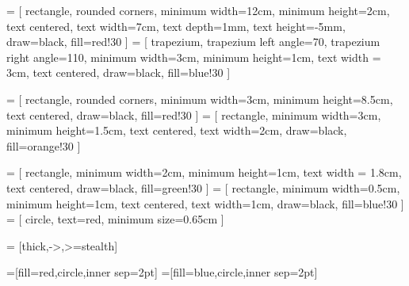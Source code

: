  = [
    rectangle, rounded corners, 
    minimum width=12cm, 
    minimum height=2cm,
    text centered, 
    text width=7cm, 
    text depth=1mm,
    text height=-5mm,
    draw=black, 
    fill=red!30
]
 = [
    trapezium, trapezium left angle=70, trapezium right angle=110, minimum width=3cm,
    minimum height=1cm, text width = 3cm, text centered, draw=black, fill=blue!30
]

 = [
    rectangle, rounded corners, 
    minimum width=3cm, 
    minimum height=8.5cm,
    text centered, 
    draw=black, 
    fill=red!30
]
 = [
    rectangle, 
    minimum width=3cm, 
    minimum height=1.5cm, 
    text centered, 
    text width=2cm, 
    draw=black, 
    fill=orange!30
]

 = [
    rectangle,
    minimum width=2cm, 
    minimum height=1cm, 
    text width = 1.8cm, 
    text centered, 
    draw=black, 
    fill=green!30
]
 = [
    rectangle, 
    minimum width=0.5cm, 
    minimum height=1cm, 
    text centered, 
    text width=1cm, 
    draw=black, 
    fill=blue!30
]
 = [
    circle, 
    text=red, 
    minimum size=0.65cm
]

 = [thick,->,>=stealth]


\usetikzlibrary{calc}
\tikzset{>=latex}
=[fill=red,circle,inner sep=2pt]
=[fill=blue,circle,inner sep=2pt]





